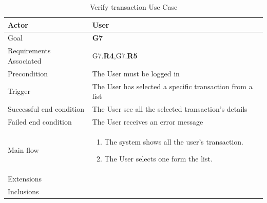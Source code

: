 \newline
\begin{table}[htb]
\begin{center}
\renewcommand{\arraystretch}{1.5}
\begin{tabular}{|l|p{}|}
\hline
Actor & User \\ \hline
Goal & \textbf{G7} \\ \hline
Requirements Associated & G7.\textbf{R4},G7.\textbf{R5} \\ \hline
Precondition & The User must be logged in \\ \hline
Trigger & The User has selected a specific transaction from a list \\ \hline
Successful end condition & The User see all the selected transaction's details \\ \hline
Failed end condition & The User receives an error message \\ \hline
Main flow & \begin{minipage}[t]{0.6\textwidth}
\begin{enumerate}
\addtolength{\itemindent}{0.5cm}
\item The system shows all the user's transaction.
\item The User selects one form the list.
\end{enumerate}
\end{minipage} \\ \hline
Extensions & \\ \hline
Inclusions &  \\ \hline
\end{tabular}
\caption{Verify transaction Use Case}
\end{center}
\end{table}
\clearpage

